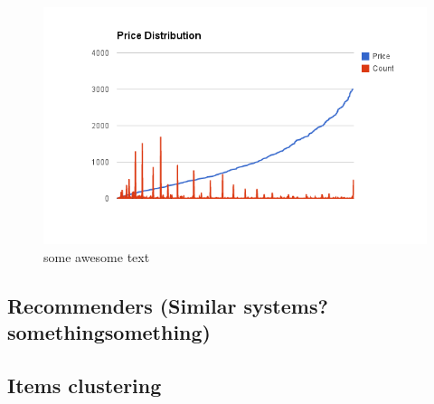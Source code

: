 \begin{figure}[H]
    \includegraphics[width=5in]{image/price_distr.png}
    \centering
    \caption[Price distribution of items]{some awesome text}
    \label{figure:ratingdistr}
\end{figure}






\subsection{Recommenders (Similar systems? somethingsomething)}
\subsection{Items clustering}




